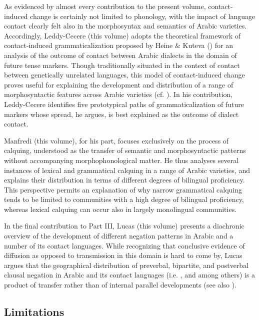 \documentclass[output=paper]{langsci/langscibook}
\begin{document}
As evidenced by almost every contribution to the present volume, contact-induced change is certainly not limited to phonology, with the impact of language contact clearly felt also in the morphosyntax and semantics of Arabic varieties. Accordingly, Leddy-Cecere (this volume) adopts the theoretical framework of contact-induced grammaticalization proposed by Heine \& Kuteva (\citeyear{HeineKuteva2003,HeineKuteva2005}) for an analysis of the outcome of contact between Arabic dialects in the domain of future tense markers. Though traditionally situated in the context of contact between genetically unrelated languages, this model of contact-induced change proves useful for explaining the development and distribution of a range of morphosyntactic features across Arabic varieties (cf. \citealt{Leddy-Cecere2018}). In his contribution, Leddy-Cecere identifies five prototypical paths of grammaticalization of future markers whose spread, he argues, is best explained as the outcome of dialect contact.

Manfredi (this volume), for his part, focuses exclusively on the process of calquing, understood as the transfer of semantic and morphosyntactic patterns without accompanying morphophonological matter. He thus analyses several instances of lexical and grammatical calquing in a range of Arabic varieties, and explains their distribution in terms of different degrees of bilingual proficiency. This perspective permits an explanation of why narrow grammatical calquing tends to be limited to communities with a high degree of bilingual proficiency, whereas lexical calquing can occur also in largely monolingual communities.

In the final contribution to Part III, Lucas (this volume) presents a diachronic overview of the development of different negation patterns in Arabic and a number of its contact languages. While recognizing that conclusive evidence of diffusion as opposed to transmission in this domain is hard to come by, Lucas argues that the geographical distribution of preverbal, bipartite, and postverbal clausal negation in Arabic and its contact languages (i.e. ,  and  among others) is a product of transfer rather than of internal parallel developments (see also \citealt{LucasLash2010}). 


\subsection{Limitations}\label{introlimitations}
\end{document}
